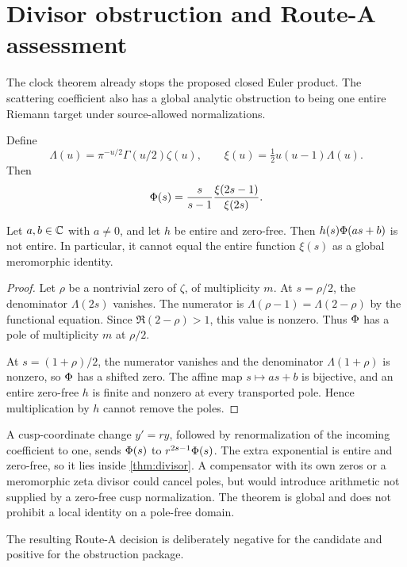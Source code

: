 \section{Divisor obstruction and Route-A assessment}

The clock theorem already stops the proposed closed Euler product.  The
scattering coefficient also has a global analytic obstruction to being one
entire Riemann target under source-allowed normalizations.

Define
\[
 \Lambda(u)=\pi^{-u/2}\Gamma(u/2)\zeta(u),\qquad
 \xi(u)=\tfrac12u(u-1)\Lambda(u).
\]
Then
\begin{equation}\label{eq:phi-xi}
 \Phi(s)=\frac{s}{s-1}\frac{\xi(2s-1)}{\xi(2s)}.
\end{equation}

\begin{theorem}
\label{thm:divisor}
Let $a,b\in\mathbb C$ with $a\ne0$, and let $h$ be entire and zero-free.  Then
$h(s)\Phi(as+b)$ is not entire.  In particular, it cannot equal the entire
function $\xi(s)$ as a global meromorphic identity.
\end{theorem}

\begin{proof}
Let $\rho$ be a nontrivial zero of $\zeta$, of multiplicity $m$.  At
$s=\rho/2$, the denominator $\Lambda(2s)$ vanishes.  The numerator is
$\Lambda(\rho-1)=\Lambda(2-\rho)$ by the functional equation.  Since
$\Re(2-\rho)>1$, this value is nonzero.  Thus $\Phi$ has a pole of
multiplicity $m$ at $\rho/2$.

At $s=(1+\rho)/2$, the numerator vanishes and the denominator
$\Lambda(1+\rho)$ is nonzero, so $\Phi$ has a shifted zero.  The affine map
$s\mapsto as+b$ is bijective, and an entire zero-free $h$ is finite and
nonzero at every transported pole.  Hence multiplication by $h$ cannot
remove the poles.
\end{proof}

A cusp-coordinate change $y'=ry$, followed by renormalization of the incoming
coefficient to one, sends $\Phi(s)$ to
$r^{2s-1}\Phi(s)$.  The extra exponential is entire and zero-free, so it
lies inside \cref{thm:divisor}.  A compensator with its own zeros or a
meromorphic zeta divisor could cancel poles, but would introduce arithmetic
not supplied by a zero-free cusp normalization.  The theorem is global and
does not prohibit a local identity on a pole-free domain.

The resulting Route-A decision is deliberately negative for the candidate
and positive for the obstruction package.

